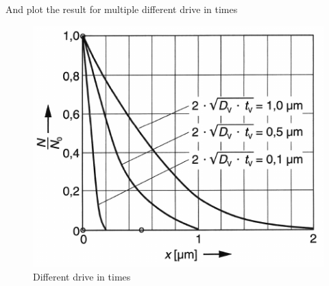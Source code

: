 And plot the result for multiple different drive in times
\begin{figure}[H]
	\centering
	\includegraphics[scale=0.5]{dopants_depth.png}
	\caption{Different drive in times}
\end{figure}




